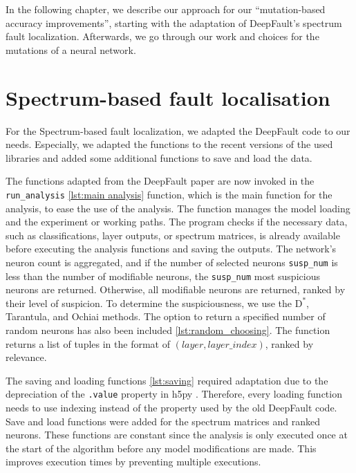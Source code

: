 In the following chapter, we describe our approach for our ``mutation-based accuracy improvements'', starting with the adaptation of DeepFault's \cite{eniser_deepfault_2019} spectrum fault localization.
Afterwards, we go through our work and choices for the mutations of a neural network.

\section{Spectrum-based fault localisation}\label{sec:spectrum-based-fault-localisation}
For the Spectrum-based fault localization, we adapted the DeepFault \cite{eniser_deepfault_2023} code to our needs.
Especially, we adapted the functions to the recent versions of the used libraries and added some additional functions to save and load the data.

The functions adapted from the DeepFault paper are now invoked in the \texttt{run\_analysis} \ref{lst:main analysis} function, which is the main function for the analysis, to ease the use of the analysis.
The function manages the model loading and the experiment or working paths.
The program checks if the necessary data, such as classifications, layer outputs, or spectrum matrices, is already available before executing the analysis functions and saving the outputs.
The network's neuron count is aggregated, and if the number of selected neurons \texttt{susp\_num} is less than the number of modifiable neurons, the \texttt{susp\_num} most suspicious neurons are returned.
Otherwise, all modifiable neurons are returned, ranked by their level of suspicion.
To determine the suspiciousness, we use the $\text{D}^*$, Tarantula, and Ochiai methods.
The option to return a specified number of random neurons has also been included \ref{lst:random_choosing}.
The function returns a list of tuples in the format of $(layer, layer\_index)$, ranked by relevance.




The saving and loading functions \ref{lst:saving} required adaptation due to the depreciation of the \texttt{.value} property in h5py \cite{collette_h5pyh5py_2022}.
Therefore, every loading function needs to use indexing instead of the property used by the old DeepFault code.
Save and load functions were added for the spectrum matrices and ranked neurons.
These functions are constant since the analysis is only executed once at the start of the algorithm before any model modifications are made.
This improves execution times by preventing multiple executions.

